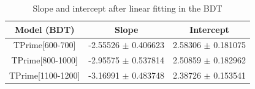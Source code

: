 \begin{table}[H]
    \centering
    \begin{tabular}{|c|c|c|}\hline
     Model (BDT)   & Slope & Intercept \\ \hline
      TPrime[600-700]   &  -2.55526 $\pm$ 0.406623 & 2.58306 $\pm$ 0.181075  \\
       TPrime[800-1000]   &  -2.95575 $\pm$ 0.537814 & 2.50859 $\pm$ 0.182962 \\
          TPrime[1100-1200]   &  -3.16991 $\pm$ 0.483748 &  2.38726 $\pm$  0.153541  \\\hline
    \end{tabular}
    \caption{Slope and intercept after linear fitting in the BDT}
    \label{tab:my_label_BDT_table}
\end{table}




